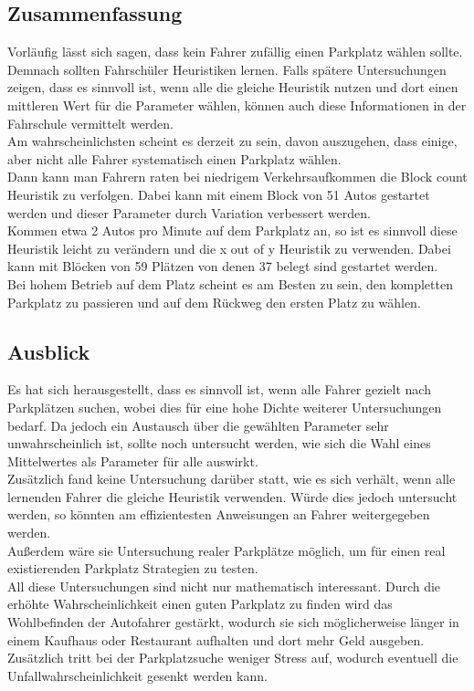 \subsection{Zusammenfassung}

Vorläufig lässt sich sagen, dass kein Fahrer zufällig einen Parkplatz wählen sollte. Demnach sollten Fahrschüler Heuristiken lernen. Falls spätere Untersuchungen zeigen, dass es sinnvoll ist, wenn alle die gleiche Heuristik nutzen und dort einen mittleren Wert für die Parameter wählen, können auch diese Informationen in der Fahrschule vermittelt werden.\\
Am wahrscheinlichsten scheint es derzeit zu sein, davon auszugehen, dass einige, aber nicht alle Fahrer systematisch einen Parkplatz wählen. \\
 Dann kann man Fahrern raten bei niedrigem Verkehrsaufkommen die Block count Heuristik zu verfolgen. Dabei kann mit einem Block von 51 Autos gestartet werden und dieser Parameter durch Variation verbessert werden.\\
 Kommen etwa 2 Autos pro Minute auf dem Parkplatz an, so ist es sinnvoll diese Heuristik leicht zu verändern und die x out of y Heuristik zu verwenden. Dabei kann mit Blöcken von 59 Plätzen von denen 37 belegt sind gestartet werden.\\
 Bei hohem Betrieb auf dem Platz scheint es am Besten zu sein, den kompletten Parkplatz zu passieren und auf dem Rückweg den ersten Platz zu wählen.\\
 
 \subsection{Ausblick}

Es hat sich herausgestellt, dass es sinnvoll ist, wenn alle Fahrer gezielt nach Parkplätzen suchen, wobei dies für eine hohe Dichte weiterer Untersuchungen bedarf. Da jedoch ein Austausch über die gewählten Parameter sehr unwahrscheinlich ist, sollte noch untersucht werden, wie sich die Wahl eines Mittelwertes als Parameter für alle auswirkt.\\
Zusätzlich fand keine Untersuchung darüber statt, wie es sich verhält, wenn alle lernenden Fahrer die gleiche Heuristik verwenden. Würde dies jedoch untersucht werden, so könnten am effizientesten Anweisungen an Fahrer weitergegeben werden. \\
Außerdem wäre sie Untersuchung realer Parkplätze möglich, um für einen real existierenden Parkplatz Strategien zu testen.\\
All diese Untersuchungen sind nicht nur mathematisch interessant. Durch die erhöhte Wahrscheinlichkeit einen guten Parkplatz zu finden wird das Wohlbefinden der Autofahrer gestärkt, wodurch sie sich möglicherweise länger in einem Kaufhaus oder Restaurant aufhalten und dort mehr Geld ausgeben. Zusätzlich tritt bei der Parkplatzsuche weniger Stress auf, wodurch eventuell die Unfallwahrscheinlichkeit gesenkt werden kann.